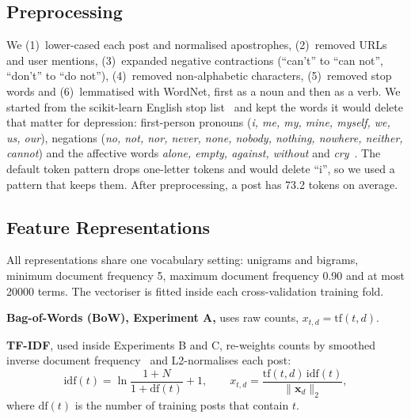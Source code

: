 \documentclass[conference]{IEEEtran}
\begin{document}
\subsection{Preprocessing}\label{sec:prep}

We (1)~lower-cased each post and normalised apostrophes, (2)~removed URLs and user mentions, (3)~expanded negative contractions (``can't'' to ``can not'', ``don't'' to ``do not''), (4)~removed non-alphabetic characters, (5)~removed stop words and (6)~lemmatised with WordNet, first as a noun and then as a verb. We started from the scikit-learn English stop list~\cite{pedregosa2011sklearn} and kept the words it would delete that matter for depression: first-person pronouns (\textit{i, me, my, mine, myself, we, us, our}), negations (\textit{no, not, nor, never, none, nobody, nothing, nowhere, neither, cannot}) and the affective words \textit{alone, empty, against, without} and \textit{cry}~\cite{rude2004language,almosaiwi2018absolute}. The default token pattern drops one-letter tokens and would delete ``i'', so we used a pattern that keeps them. After preprocessing, a post has 73.2 tokens on average.

\subsection{Feature Representations}

All representations share one vocabulary setting: unigrams and bigrams, minimum document frequency 5, maximum document frequency 0.90 and at most \num{20000} terms. The vectoriser is fitted inside each cross-validation training fold.

\textbf{Bag-of-Words (BoW), Experiment A,} uses raw counts, $x_{t,d}=\mathrm{tf}(t,d)$.

\textbf{TF-IDF}, used inside Experiments B and C, re-weights counts by smoothed inverse document frequency~\cite{salton1988term} and L2-normalises each post:
\begin{equation}
\mathrm{idf}(t)=\ln\frac{1+N}{1+\mathrm{df}(t)}+1,\qquad
x_{t,d}=\frac{\mathrm{tf}(t,d)\,\mathrm{idf}(t)}{\lVert \mathbf{x}_d\rVert_2},
\label{eq:tfidf}
\end{equation}
where $\mathrm{df}(t)$ is the number of training posts that contain $t$.
\end{document}
